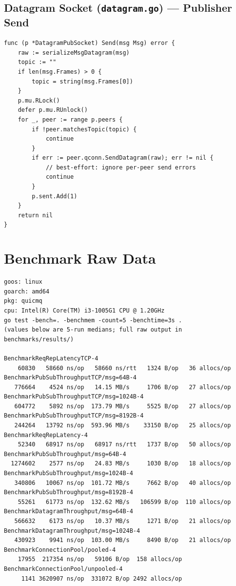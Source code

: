 \documentclass[12pt, a4paper, oneside]{report}
\begin{document}
\section{Datagram Socket (\texttt{datagram.go}) — Publisher Send}

\begin{lstlisting}[caption={DatagramPubSocket fan-out (excerpt from \texttt{datagram.go}).}]
func (p *DatagramPubSocket) Send(msg Msg) error {
    raw := serializeMsgDatagram(msg)
    topic := ""
    if len(msg.Frames) > 0 {
        topic = string(msg.Frames[0])
    }
    p.mu.RLock()
    defer p.mu.RUnlock()
    for _, peer := range p.peers {
        if !peer.matchesTopic(topic) {
            continue
        }
        if err := peer.qconn.SendDatagram(raw); err != nil {
            // best-effort: ignore per-peer send errors
            continue
        }
        p.sent.Add(1)
    }
    return nil
}
\end{lstlisting}

\chapter{Benchmark Raw Data}
\label{app:bench}

\begin{verbatim}
goos: linux
goarch: amd64
pkg: quicmq
cpu: Intel(R) Core(TM) i3-1005G1 CPU @ 1.20GHz
go test -bench=. -benchmem -count=5 -benchtime=3s .
(values below are 5-run medians; full raw output in benchmarks/results/)

BenchmarkReqRepLatencyTCP-4
    60830   58660 ns/op   58660 ns/rtt   1324 B/op   36 allocs/op
BenchmarkPubSubThroughputTCP/msg=64B-4
   776664    4524 ns/op   14.15 MB/s     1706 B/op   27 allocs/op
BenchmarkPubSubThroughputTCP/msg=1024B-4
   604772    5892 ns/op  173.79 MB/s     5525 B/op   27 allocs/op
BenchmarkPubSubThroughputTCP/msg=8192B-4
   244264   13792 ns/op  593.96 MB/s    33150 B/op   25 allocs/op
BenchmarkReqRepLatency-4
    52340   68917 ns/op   68917 ns/rtt   1737 B/op   50 allocs/op
BenchmarkPubSubThroughput/msg=64B-4
  1274602    2577 ns/op   24.83 MB/s     1030 B/op   18 allocs/op
BenchmarkPubSubThroughput/msg=1024B-4
   340806   10067 ns/op  101.72 MB/s     7662 B/op   40 allocs/op
BenchmarkPubSubThroughput/msg=8192B-4
    55261   61773 ns/op  132.62 MB/s   106599 B/op  110 allocs/op
BenchmarkDatagramThroughput/msg=64B-4
   566632    6173 ns/op   10.37 MB/s     1271 B/op   21 allocs/op
BenchmarkDatagramThroughput/msg=1024B-4
   430923    9941 ns/op  103.00 MB/s     8490 B/op   21 allocs/op
BenchmarkConnectionPool/pooled-4
    17955  217354 ns/op   59106 B/op  158 allocs/op
BenchmarkConnectionPool/unpooled-4
     1141 3620907 ns/op  331072 B/op 2492 allocs/op
\end{verbatim}
\end{document}
